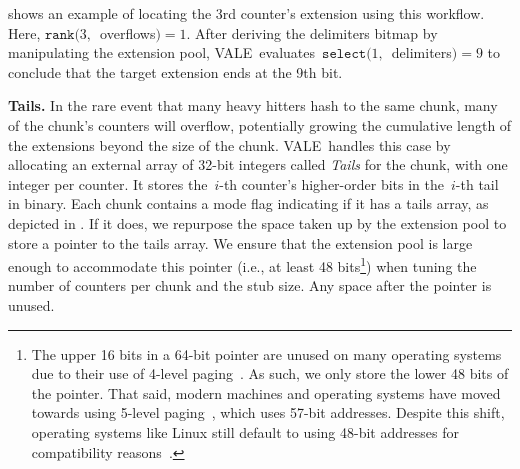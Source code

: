 \documentclass[sigconf]{acmart}
\newcommand{\counterencodingabbrv}{VALE}
\begin{document}
 shows an example of locating the 3rd
counter's extension using this workflow. Here,
$\texttt{rank}(3,$~overflows$)=1$. After deriving the delimiters bitmap by
manipulating the extension pool, \counterencodingabbrv\
evaluates~$\texttt{select}(1,$~delimiters$)=9$ to conclude that the target
extension ends at the 9th bit.

\textbf{Tails.}
In the rare event that many heavy hitters hash to the same chunk, many of the
chunk's counters will overflow, potentially growing the cumulative length of
the extensions beyond the size of the chunk. \counterencodingabbrv\ handles
this case by allocating an external array of 32-bit integers called
\emph{Tails} for the chunk, with one integer per counter. It stores
the~$i${\nobreakdash-}th counter's higher-order bits in
the~$i${\nobreakdash-}th tail in binary. Each chunk contains a mode flag
indicating if it has a tails array, as depicted in
.
If it does, we repurpose the space taken up by the extension pool to store a
pointer to the tails array. We ensure that the extension pool is large enough
to accommodate this pointer (i.e., at least 48 bits\footnote{The upper 16 bits
in a 64-bit pointer are unused on many operating systems due to their use of
4-level paging~\cite{Intel4LevelPaging}. As such, we only store the lower 48
bits of the pointer. That said, modern machines and operating systems have
moved towards using 5-level paging~\cite{Intel5LevelPaging}, which uses 57-bit
addresses. Despite this shift, operating systems like Linux still default to
using 48-bit addresses for compatibility reasons~\cite{Linux5LevelPaging}.})
when tuning the number of counters per chunk and the stub size. Any space after
the pointer is unused. 
\end{document}
